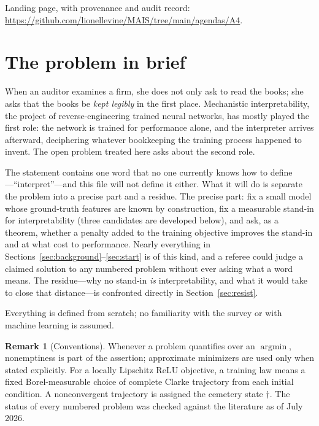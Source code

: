 \documentclass[11pt]{amsart}
\theoremstyle{plain}
\theoremstyle{definition}
\newtheorem{remark}[theorem]{Remark}
\begin{document}
\noindent Landing page, with provenance and audit record: \url{https://github.com/lionellevine/MAIS/tree/main/agendas/A4}.

\section{The problem in brief}

When an auditor examines a firm, she does not only ask to read the books; she asks that the books be \emph{kept legibly} in the first place. Mechanistic interpretability, the project of reverse-engineering trained neural networks, has mostly played the first role: the network is trained for performance alone, and the interpreter arrives afterward, deciphering whatever bookkeeping the training process happened to invent. The open problem treated here asks about the second role.



The statement contains one word that no one currently knows how to define---``interpret''---and this file will not define it either. What it will do is separate the problem into a precise part and a residue. The precise part: fix a small model whose ground-truth features are known by construction, fix a measurable stand-in for interpretability (three candidates are developed below), and ask, as a theorem, whether a penalty added to the training objective improves the stand-in and at what cost to performance. Nearly everything in Sections~\ref{sec:background}--\ref{sec:start} is of this kind, and a referee could judge a claimed solution to any numbered problem without ever asking what a word means. The residue---why no stand-in \emph{is} interpretability, and what it would take to close that distance---is confronted directly in Section~\ref{sec:resist}.

Everything is defined from scratch; no familiarity with the survey or with machine learning is assumed.

\begin{remark}[Conventions]\label{rem:attain}
Whenever a problem quantifies over an $\operatorname{argmin}$, nonemptiness is part of the assertion; approximate minimizers are used only when stated explicitly. For a locally Lipschitz ReLU objective, a training law means a fixed Borel-measurable choice of complete Clarke trajectory from each initial condition. A nonconvergent trajectory is assigned the cemetery state $\dagger$. The status of every numbered problem was checked against the literature as of July 2026.
\end{remark}
\end{document}
